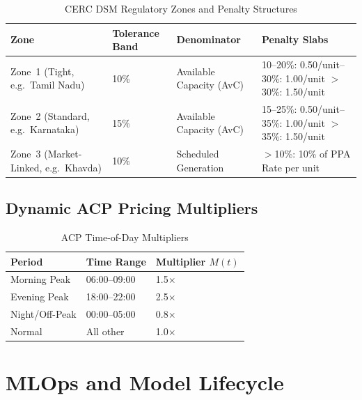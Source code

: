 \documentclass[12pt,a4paper]{report}
\begin{document}
\begin{table}[H]
  \centering
  \caption{CERC DSM Regulatory Zones and Penalty Structures}
  \label{tab:dsm_zones}
  \begin{tabularx}{\textwidth}{lXXX}
    \toprule
    \textbf{Zone} & \textbf{Tolerance Band} & \textbf{Denominator} & \textbf{Penalty Slabs} \\
    \midrule
    Zone~1 (Tight, e.g.\ Tamil Nadu)
      & 10\% & Available Capacity (AvC)
      & 10--20\%: \textnumero{}0.50/unit\newline
        20--30\%: \textnumero{}1.00/unit\newline
        $>$30\%: \textnumero{}1.50/unit \\[4pt]
    Zone~2 (Standard, e.g.\ Karnataka)
      & 15\% & Available Capacity (AvC)
      & 15--25\%: \textnumero{}0.50/unit\newline
        25--35\%: \textnumero{}1.00/unit\newline
        $>$35\%: \textnumero{}1.50/unit \\[4pt]
    Zone~3 (Market-Linked, e.g.\ Khavda)
      & 10\% & Scheduled Generation
      & $>$10\%: 10\% of PPA Rate per unit \\
    \bottomrule
  \end{tabularx}
\end{table}

\section{Dynamic ACP Pricing Multipliers}

\begin{table}[H]
  \centering
  \caption{ACP Time-of-Day Multipliers}
  \label{tab:acp}
  \begin{tabular}{lll}
    \toprule
    \textbf{Period} & \textbf{Time Range} & \textbf{Multiplier $M(t)$} \\
    \midrule
    Morning Peak  & 06:00--09:00 & 1.5$\times$ \\
    Evening Peak  & 18:00--22:00 & 2.5$\times$ \\
    Night/Off-Peak& 00:00--05:00 & 0.8$\times$ \\
    Normal        & All other    & 1.0$\times$ \\
    \bottomrule
  \end{tabular}
\end{table}

\chapter{MLOps and Model Lifecycle}
\label{ch:mlops}
\end{document}
